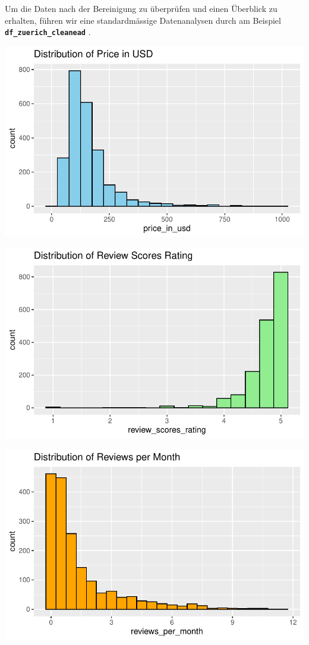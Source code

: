 \documentclass[
  journal,
]{IEEEtran}%
\begin{document}
Um die Daten nach der Bereinigung zu überprüfen und einen Überblick zu
erhalten, führen wir eine standardmässige Datenanalysen durch am
Beispiel \textbf{\texttt{df\_zuerich\_cleanead}} .

\includegraphics{main_files/figure-pdf/eda-1.pdf}

\includegraphics{main_files/figure-pdf/eda-2.pdf}

\includegraphics{main_files/figure-pdf/eda-3.pdf}
\end{document}
